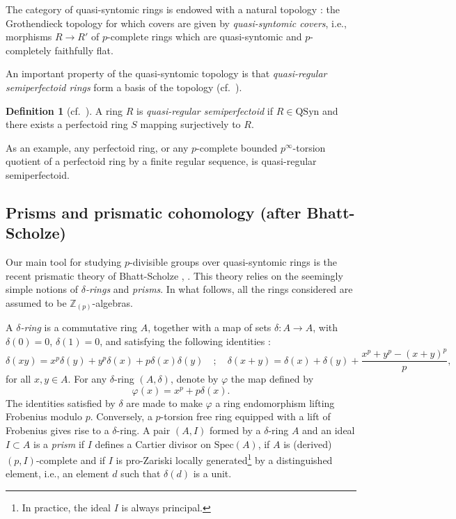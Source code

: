 \documentclass{amsart}
\theoremstyle{plain}
\theoremstyle{definition}
\newtheorem{definition}[theorem]{Definition}
\begin{document}
The category of quasi-syntomic rings is endowed with a natural topology : the Grothendieck topology for which covers are given by \textit{quasi-syntomic covers}, i.e., morphisms $R \to R'$ of $p$-complete rings which are quasi-syntomic and $p$-completely faithfully flat.

An important property of the quasi-syntomic topology is that \textit{quasi-regular semiperfectoid rings} form a basis of the topology (cf.\ ).

\begin{definition}[cf.\ ]
  \label{sec:quasi-syntomic-rings-2-definition-qrsp-introduction}
A ring $R$ is \textit{quasi-regular semiperfectoid} if $R \in \mathrm{QSyn}$ and
there exists a perfectoid ring $S$ mapping surjectively to $R$.
\end{definition}

As an example, any perfectoid ring, or any $p$-complete bounded $p^{\infty}$-torsion quotient of a perfectoid ring by a finite regular
sequence, is quasi-regular semiperfectoid.

\subsection{Prisms and prismatic cohomology (after Bhatt-Scholze)}
Our main tool for studying $p$-divisible groups over quasi-syntomic rings is the recent prismatic theory of Bhatt-Scholze \cite{bhatt_scholze_prisms_and_prismatic_cohomology}, \cite{bhatt_lectures_on_prismatic_cohomology}. This theory relies on the seemingly simple notions of \textit{$\delta$-rings} and \textit{prisms}. In what follows, all the rings considered are assumed to be $\mathbb{Z}_{(p)}$-algebras.

A \textit{$\delta$-ring} is a commutative ring $A$, together with a map of sets $\delta : A\to A$, with $\delta(0)=0$, $\delta(1)=0$, and satisfying the following identities :
\[ \delta(xy)= x^p \delta(y) + y^p \delta(x)+ p\delta(x)\delta(y) \quad ; \quad \delta(x+y)=\delta(x)+\delta(y)+\frac{x^p+y^p-(x+y)^p}{p}, \]
for all $x, y \in A$. For any $\delta$-ring $(A,\delta)$, denote by $\varphi$ the map defined by $$\varphi(x)=x^p+p\delta(x).$$ The identities satisfied by $\delta$ are made to make $\varphi$ a ring endomorphism lifting Frobenius modulo $p$. Conversely, a $p$-torsion free ring equipped with a lift of Frobenius gives rise to a $\delta$-ring. A pair $(A,I)$ formed by a $\delta$-ring $A$ and an ideal $I \subset A$ is a \textit{prism} if $I$ defines a Cartier divisor on $\mathrm{Spec}(A)$, if $A$ is (derived) $(p,I)$-complete and if $I$ is pro-Zariski locally generated\footnote{In practice, the ideal $I$ is always principal.} by a distinguished element, i.e., an element $d$ such that $\delta(d)$ is a unit.
\end{document}
